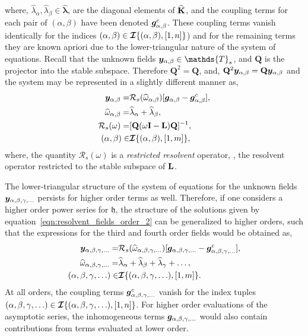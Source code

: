 where, $\widehat{\lambda}_{\alpha},\widehat{\lambda}_{\beta} \in \widehat{\boldsymbol{\lambda}}$, are the diagonal elements of $\mathbf{\widehat{K}}$, and the coupling terms for each pair of $(\alpha,\beta)$ have been denoted $\boldsymbol{g}^{c}_{\alpha,\beta}$. These coupling terms vanish identically for the indices $(\alpha,\beta)\in\bm{\mathcal{I}}\{(\alpha,\beta),[1,n]\}$) and for the remaining terms they are known apriori due to the lower-triangular nature of the system of equations. Recall that the unknown fields $\vfield{y}_{\alpha,\beta}\in\mathds{T}_{s}$, and $\mathbf{Q}$ is the projector into the stable subspace. Therefore $\mathbf{Q}^{2} = \mathbf{Q}$, and, $\mathbf{Q}^{2}\boldsymbol{y}_{\alpha,\beta} = \mathbf{Q}\boldsymbol{y}_{\alpha,\beta}$ and the system may be represented in a slightly different manner as, 
	\begin{align}
	\label{eqn:resolvent_fields_order_2}
	\begin{split}
		\boldsymbol{y}_{\alpha,\beta} =&  \mathcal{R}_{s}(\widehat{\omega}_{\alpha,\beta})[\boldsymbol{g}_{\alpha,\beta} - \boldsymbol{g}^{c}_{\alpha,\beta}], \\
		\widehat{\omega}_{\alpha,\beta} =& \widehat{\lambda}_{\alpha} + \widehat{\lambda}_{\beta}, \\
		\mathcal{R}_{s}(\omega) =& [\mathbf{Q}(\omega\mathbf{I} 
		- \mathbf{L})\mathbf{Q}]^{-1}, \\
		(\alpha,\beta) \in& \bm{\mathcal{I}}\{(\alpha,\beta),[1,m]\},
	\end{split}
\end{align}
where, the quantity $\mathcal{R}_{s}(\omega)$ is a \emph{restricted resolvent} operator, \ie, the resolvent operator restricted to the stable subspace of $\mathbf{L}$. 

The lower-triangular structure of the system of equations for the unknown fields $\boldsymbol{y}_{\alpha,\beta,\gamma,\ldots}$ persists for higher order terms as well. Therefore, if one considers a higher order power series for $\mathfrak{h}$, the structure of the solutions given by equation~\eqref{eqn:resolvent_fields_order_2} can be generalized to higher orders, such that the expressions for the third and fourth order fields would be obtained as,
\begin{align}
	\label{eqn:resolvent_fields_higher_order}
	\begin{split}
		\boldsymbol{y}_{\alpha,\beta,\gamma,\ldots} =&  	\mathcal{R}_{s}(\widehat{\omega}_{\alpha,\beta,\gamma,\ldots})[\boldsymbol{g}_{\alpha,\beta,\gamma,\ldots} - \boldsymbol{g}^{c}_{\alpha,\beta,\gamma,\ldots}], \\
		\widehat{\omega}_{\alpha,\beta,\gamma,\ldots} =& \widehat{\lambda}_{\alpha} + 	\widehat{\lambda}_{\beta} + \widehat{\lambda}_{\gamma} + \ldots, \\
		(\alpha,\beta,\gamma,\ldots) \in& \bm{\mathcal{I}}\{(\alpha,\beta,\gamma,\ldots),[1,m]\}.
	\end{split} 
\end{align}
At all orders, the coupling terms $\boldsymbol{g}^{c}_{\alpha,\beta,\gamma,\ldots}$ vanish for the index tuples $(\alpha,\beta,\gamma,\ldots)\in\bm{\mathcal{I}}\{(\alpha,\beta,\gamma,\ldots),[1,n]\}$. For higher order evaluations of the asymptotic series, the inhomogeneous terms $\boldsymbol{g}_{\alpha,\beta,\gamma,\ldots}$ would also contain contributions from terms evaluated at lower order. 

